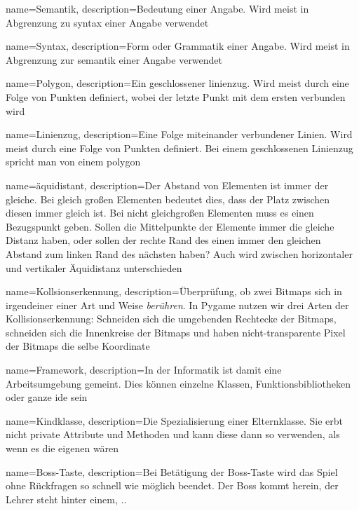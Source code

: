 {
  name={Semantik},
  description={Bedeutung einer Angabe. Wird meist in Abgrenzung zu \Gls{syntax} einer Angabe verwendet} 
}

{
  name={Syntax},
  description={Form oder Grammatik einer Angabe. Wird meist in Abgrenzung zur \Gls{semantik} einer Angabe verwendet} 
}

{
  name={Polygon},
  description={Ein geschlossener \gls{linienzug}. Wird meist durch eine Folge von Punkten definiert, wobei der letzte Punkt mit dem ersten verbunden wird} 
}

{
  name={Linienzug},
  description={Eine Folge miteinander verbundener Linien. Wird meist durch eine Folge von Punkten definiert. Bei einem geschlossenen Linienzug spricht man von einem \gls{polygon}} 
}

{
	name={\"aquidistant},
	description={Der Abstand von Elementen ist immer der gleiche. Bei gleich großen Elementen bedeutet dies, dass der Platz zwischen diesen immer gleich ist. Bei nicht gleichgroßen Elementen muss es einen Bezugspunkt geben. Sollen die Mittelpunkte der Elemente immer die gleiche Distanz haben, oder sollen der rechte Rand des einen immer den gleichen Abstand zum linken Rand des nächsten haben? Auch wird zwischen horizontaler und vertikaler Äquidistanz unterschieden} 
}

 {
 	name={Kollsionserkennung},
 	description={Überprüfung, ob zwei Bitmaps sich in irgendeiner einer Art und Weise \emph{berühren}. In Pygame nutzen wir drei Arten der Kollisionserkennung: Schneiden sich die umgebenden Rechtecke der Bitmaps, schneiden sich die Innenkreise der Bitmaps und haben nicht-transparente Pixel der Bitmaps die selbe Koordinate} 
 }
 
 {
 	name={Framework},
 	description={In der Informatik ist damit eine Arbeitsumgebung gemeint. Dies können einzelne Klassen, Funktionsbibliotheken oder ganze \Gls{ide} sein} 
 }
 
 {
 	name={Kindklasse},
 	description={Die Spezialisierung einer Elternklasse. Sie erbt nicht private Attribute und Methoden und kann diese dann so verwenden, als wenn es die eigenen wären} 
 }

{
	name={Boss-Taste},
	description={Bei Betätigung der Boss-Taste wird das Spiel ohne Rückfragen so schnell wie möglich beendet. Der Boss kommt herein, der Lehrer steht hinter einem, ..} 
}

